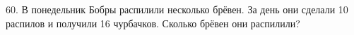 60. В понедельник Бобры распилили несколько брёвен. За день они сделали 10 распилов и получили 16 чурбачков. Сколько брёвен они распилили?\\
